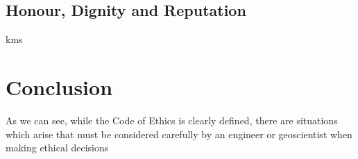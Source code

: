 \documentclass[letterpaper,12pt]{article}
\begin{document}
\subsection{Honour, Dignity and Reputation}
kms

\section{Conclusion}
As we can see, while the Code of Ethics is clearly defined, there are situations which arise that must be considered carefully by an engineer or
geoscientist when making ethical decisions


\singlespacing
\nocite{*}
\printbibliography
\end{document}
